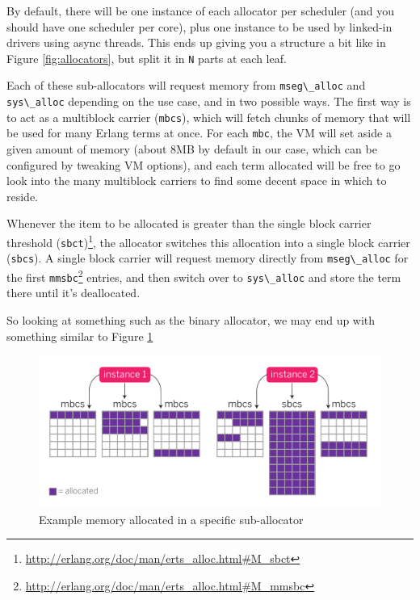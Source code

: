 \documentclass[11pt, oneside]{book}   	%
\newcommand{\var}[1]{\Verb`#1`}
\newcommand{\term}[1]{\Verb`#1`}
\begin{document}
By default, there will be one instance of each allocator per scheduler (and you should have one scheduler per core), plus one instance to be used by linked-in drivers using async threads. This ends up giving you a structure a bit like in Figure \ref{fig:allocators}, but split it in \var{N} parts at each leaf.

Each of these sub-allocators will request memory from \term{mseg\_alloc} and \term{sys\_alloc} depending on the use case, and in two possible ways. The first way is to act as a multiblock carrier (\term{mbcs}), which will fetch chunks of memory that will be used for many Erlang terms at once. For each \term{mbc}, the VM will set aside a given amount of memory (about 8MB by default in our case, which can be configured by tweaking VM options), and each term allocated will be free to go look into the many multiblock carriers to find some decent space in which to reside.

Whenever the item to be allocated is greater than the single block carrier threshold (\term{sbct})\footnote{\href{http://erlang.org/doc/man/erts\_alloc.html\#M\_sbct}{http://erlang.org/doc/man/erts\_alloc.html\#M\_sbct}}, the allocator switches this allocation into a single block carrier (\term{sbcs}). A single block carrier will request memory directly from \term{mseg\_alloc} for the first \term{mmsbc}\footnote{\href{http://erlang.org/doc/man/erts\_alloc.html\#M\_mmsbc}{http://erlang.org/doc/man/erts\_alloc.html\#M\_mmsbc}} entries, and then switch over to \term{sys\_alloc} and store the term there until it's deallocated.

So looking at something such as the binary allocator, we may end up with something similar to Figure \ref{fig:allocation-1-normal}

\begin{figure}
  \includegraphics{allocation-1-normal.pdf}%
  \caption{Example memory allocated in a specific sub-allocator}%
   \label{fig:allocation-1-normal}
\end{figure}
\end{document}
